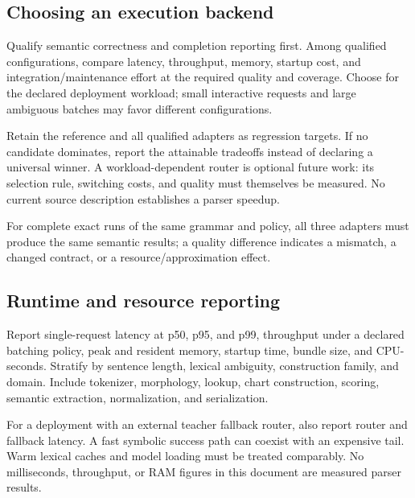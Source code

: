 \documentclass[11pt,a4paper]{article}
\begin{document}
\subsection{Choosing an execution backend}
Qualify semantic correctness and completion reporting first. Among qualified
configurations, compare latency, throughput, memory, startup cost, and
integration/maintenance effort at the required quality and coverage.
Choose for the declared deployment workload; small interactive requests and
large ambiguous batches may favor different configurations.

Retain the reference and all qualified adapters as regression targets.
If no candidate dominates, report the attainable tradeoffs instead of
declaring a universal winner. A workload-dependent router is optional future
work: its selection rule, switching costs, and quality must themselves be
measured. No current source description establishes a parser speedup.

For complete exact runs of the same grammar and policy, all three adapters must produce
the same semantic results; a quality difference indicates a mismatch,
a changed contract, or a resource/approximation effect.

\subsection{Runtime and resource reporting}
Report single-request latency at p50, p95, and p99, throughput under a declared
batching policy, peak and resident memory, startup time, bundle size, and
CPU-seconds. Stratify by sentence length, lexical ambiguity, construction
family, and domain. Include tokenizer, morphology, lookup, chart construction,
scoring, semantic extraction, normalization, and serialization.

For a deployment with an external teacher fallback router, also report
router and fallback latency. A fast
symbolic success path can coexist with an expensive tail. Warm lexical
caches and model loading must be treated comparably. No milliseconds,
throughput, or RAM figures in this document are measured parser results.
\end{document}
